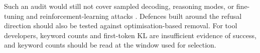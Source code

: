 Such an audit would still not cover sampled
decoding, reasoning modes, or fine-tuning and reinforcement-learning attacks
\cite{qi2024finetuning,russinovich2026grp}. Defences built around the refusal
direction \cite{yu2025refusal,xie2025beyond,muhamed2026decoy} should also be
tested against optimisation-based removal. For tool developers, keyword counts
and first-token KL are insufficient evidence of success, and keyword counts
should be read at the window used for selection.


